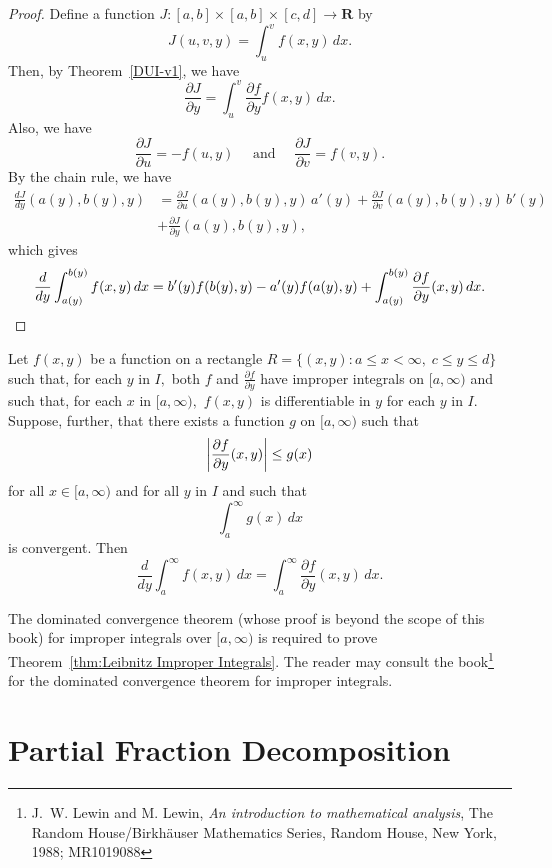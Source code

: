 \begin{proof}
	Define  a function $J:  [a, b]\times [a, b]\times [c, d]\to \mathbf R$ by
	\[J(u, v, y) = \int_u^v f(x, y)\, dx. \]
	Then, by Theorem~\ref{DUI-v1}, we have
	\[\frac{\partial J}{\partial y} = \int_u^v \frac{\partial f}{\partial y} f(x, y) \, dx.\]
	Also, we have
	\[\frac{\partial J}{\partial u}=  - f(u, y) \quad\text{ and }\quad 
	\frac{\partial J}{\partial v}=   f(v, y).\]
	By the chain rule, we have
	\[\begin{split}
		\frac{dJ}{dy} (a(y), b(y), y)& =\frac{\partial J}{\partial u} (a(y), b(y), y)\, a'(y) + \frac{\partial J}{\partial v} (a(y), b(y), y)\, b'(y) \\
		&+ \frac{\partial J}{\partial y} (a(y), b(y), y),
	\end{split}
	\]
	which gives
		\[\frac{d}{dy}\int_{a(y)}^{b(y)}  f(x, y)\, dx =   b'(y) f(b(y), y) - a'(y) f(a(y), y) +\int_{a(y)}^{b(y)} \frac{\partial f}{\partial y}(x, y) \,  dx.\qedhere\]
	\end{proof}
	
	\begin{theorem}\label{thm:Leibnitz Improper Integrals}
		Let $f(x, y)$ be a  function on a rectangle $R=\{(x, y): a\le x <\infty, \; c\le  y\le d\}$ such that, for each $y$ in $I,$ both $f$ and $\frac{\partial f}{\partial y}$ have  improper integrals on $[a, \infty)$ and such that, for each $x$ in $[a, \infty),$ $f(x, y)$ is differentiable in $y$ for each $y$ in $I.$ Suppose, further, that there exists a function $g$ on $[a, \infty)$ such that 
		\[\abs{\frac{\partial f}{\partial y}(x, y)}\le g(x)\] for all $x\in [a, \infty)$ and for all $y$ in $I$ and such that 
		\[\int_a^\infty g(x) \,dx\] is convergent.
	Then 
	\[\frac{d}{dy}\int_a^\infty  f(x, y)\, dx =  \int_a^\infty \frac{\partial f}{\partial y}(x, y) \,  dx.\]
	\end{theorem}
	

	The dominated convergence theorem (whose proof is beyond the scope of this book) for improper integrals over $[a, \infty)$ is required to prove Theorem~\ref{thm:Leibnitz Improper Integrals}. The reader may consult the book\footnote{J.~W. Lewin and M. Lewin, {\it An introduction to mathematical analysis}, The Random House/Birkh\"auser Mathematics Series, Random House, New York, 1988; MR1019088} for the dominated convergence theorem for improper integrals.





\chapter{Partial Fraction Decomposition}\label{partial-fraction-decomposition}


